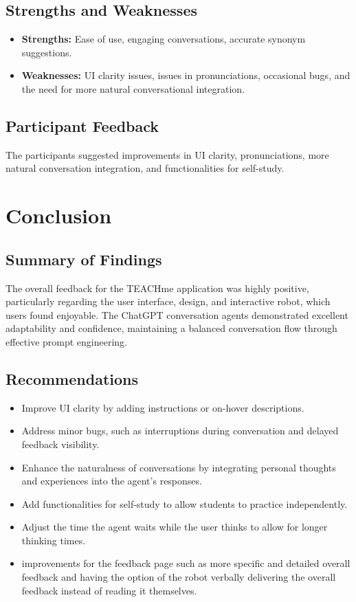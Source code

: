 \documentclass{article}
\begin{document}
\subsection{Strengths and Weaknesses}
\begin{itemize}
    \item \textbf{Strengths:} Ease of use, engaging conversations, accurate synonym suggestions.
    \item \textbf{Weaknesses:} UI clarity issues, issues in pronunciations, occasional bugs, and the need for more natural conversational integration.
\end{itemize}

\subsection{Participant Feedback}
The participants suggested improvements in UI clarity, pronunciations, more natural conversation integration, and functionalities for self-study.

\section{Conclusion}

\subsection{Summary of Findings}
The overall feedback for the TEACHme application was highly positive, particularly regarding the user interface, design, and interactive robot, which users found enjoyable. The ChatGPT conversation agents demonstrated excellent adaptability and confidence, maintaining a balanced conversation flow through effective prompt engineering.

\subsection{Recommendations}
\begin{itemize}
    \item Improve UI clarity by adding instructions or on-hover descriptions.
    \item Address minor bugs, such as interruptions during conversation and delayed feedback visibility.
    \item Enhance the naturalness of conversations by integrating personal thoughts and experiences into the agent's responses.
    \item Add functionalities for self-study to allow students to practice independently.
    \item Adjust the time the agent waits while the user thinks to allow for longer thinking times.
    \item improvements for the feedback page such as more specific and detailed overall feedback and having the option of the robot verbally delivering the overall feedback instead of reading it themselves.
\end{itemize}
\end{document}
